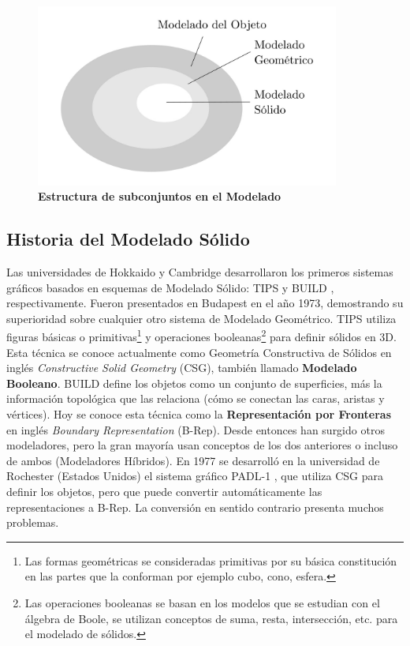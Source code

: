 \begin{figure}[h]
\includegraphics[width=10cm]{Img/GEO/geo-modelado0.jpg}
\centering
\caption{\textbf{\footnotesize{Estructura de subconjuntos en el Modelado}}}
\end{figure}


\subsection{Historia del Modelado Sólido }
Las universidades de Hokkaido y Cambridge desarrollaron los primeros sistemas gráficos basados en esquemas de Modelado Sólido: TIPS y BUILD \citep{Toriya:1993:CPA:562297}, respectivamente. Fueron presentados en Budapest en el año 1973, demostrando su superioridad sobre cualquier otro sistema de Modelado Geométrico.
TIPS utiliza figuras básicas o primitivas\footnote{ Las formas geométricas se consideradas primitivas por su básica constitución en las partes que la conforman por ejemplo cubo, cono, esfera.} y operaciones booleanas\footnote{Las operaciones booleanas se basan en los modelos que se estudian con el álgebra de Boole, se utilizan conceptos de suma, resta, intersección, etc. para el modelado de sólidos.} para definir sólidos en 3D. Esta técnica se conoce actualmente como Geometría Constructiva de Sólidos en inglés \textit{Constructive Solid Geometry} (CSG), también llamado \textbf{Modelado Booleano}.
BUILD define los objetos como un conjunto de superficies, más la información topológica que las relaciona (cómo se conectan las caras, aristas y vértices). Hoy se conoce esta técnica como la \textbf{Representación por Fronteras} en inglés \textit{Boundary Representation} (B-Rep).
Desde entonces han surgido otros modeladores, pero la gran mayoría usan conceptos de los dos anteriores o incluso de ambos (Modeladores Híbridos).
En 1977 se desarrolló en la universidad de Rochester (Estados Unidos) el sistema gráfico PADL-1 \citep{Toriya:1993:CPA:562297}, que utiliza CSG para definir los objetos, pero que puede convertir automáticamente las representaciones a B-Rep. La conversión en sentido contrario presenta muchos problemas. 

